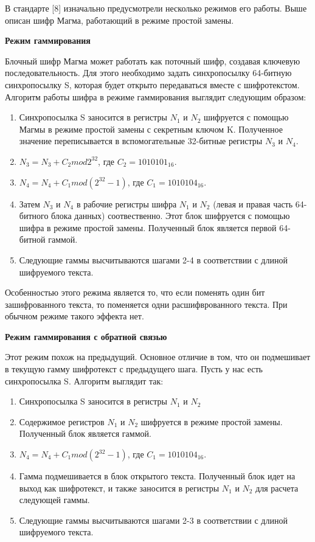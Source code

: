 \documentclass[colorthm]{./civarticle}
\begin{document}
В стандарте [8] изначально предусмотрели несколько режимов его работы. Выше описан шифр Магма, работающий в режиме простой замены. 

\textbf{Режим гаммирования}

Блочный шифр Магма может работать как поточный шифр, создавая ключевую последовательность. Для этого необходимо задать синхропосылку 64-битную синхропосылку S, которая будет открыто передаваться вместе с шифротекстом. Алгоритм работы шифра в режиме гаммирования выглядит следующим образом:

\begin{enumerate}
    \item Синхропосылка S заносится в регистры $N_1$ и $N_2$ шифруется с помощью Магмы в режиме простой замены с секретным ключом K. Полученное значение переписывается в вспомогательные 32-битные регистры $N_3$ и $N_4$.
    \item $N_3 = N_3 + C_2 mod 2^{32}$, где $C_2 = 1010101_{16}$.
    \item $N_4 = N_4 + C_1 mod (2^{32} - 1)$, где $C_1 = 1010104_{16}$.
    \item Затем $N_3$ и $N_4$ в рабочие регистры шифра $N_1$ и $N_2$ (левая и правая часть 64-битного блока данных) соотвественно. Этот блок шифруется с помощью шифра в режиме простой замены. Полученный блок является первой 64-битной гаммой.
    \item Следующие гаммы высчитываются шагами 2-4  в соответствии с длиной шифруемого текста.
\end{enumerate}

Особенностью этого режима является то, что если поменять один бит зашифрованного текста, то поменяется одни расшифврованного текста. При обычном режиме такого эффекта нет.

\textbf{Режим гаммирования с обратной связью}

Этот режим похож на предыдущий. Основное отличие в том, что он подмешивает в текущую гамму шифротекст с предыдущего шага. Пусть у нас есть синхропосылка S. Алгоритм выглядит так: 

\begin{enumerate}
    \item Синхропосылка S заносится в регистры $N_1$ и $N_2$
    \item Содержимое регистров $N_1$ и $N_2$ шифруется в режиме простой замены. Полученный блок является гаммой.
    \item $N_4 = N_4 + C_1 mod (2^{32} - 1)$, где $C_1 = 1010104_{16}$.
    \item Гамма подмешивается в блок открытого текста. Полученный блок идет на выход как шифротекст, и также заносится в регистры $N_1$ и $N_2$ для расчета следующей гаммы.
    \item Следующие гаммы высчитываются шагами 2-3 в соответствии с длиной шифруемого текста.
\end{enumerate}
\end{document}
